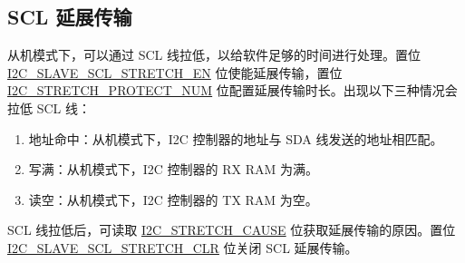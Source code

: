\documentclass[main\_\_CN.tex]{subfiles}
\begin{document}
\subsection {SCL 延展传输}
从机模式下，可以通过 SCL 线拉低，以给软件足够的时间进行处理。置位 \hyperref[fielddesc:I2CSLAVESCLSTRETCHEN]{I2C\_SLAVE\_SCL\_STRETCH\_EN} 位使能延展传输，置位 \hyperref[fielddesc:I2CSTRETCHPROTECTNUM]{I2C\_STRETCH\_PROTECT\_NUM} 位配置延展传输时长。出现以下三种情况会拉低 SCL 线：
\begin{enumerate}
\item 地址命中：从机模式下，I2C 控制器的地址与 SDA 线发送的地址相匹配。
\item 写满：从机模式下，I2C 控制器的 RX RAM 为满。
\item 读空：从机模式下，I2C 控制器的 TX RAM 为空。
\end{enumerate}
SCL 线拉低后，可读取 \hyperref[fielddesc:I2CSTRETCHCAUSE]{I2C\_STRETCH\_CAUSE} 位获取延展传输的原因。置位 \hyperref[fielddesc:I2CSLAVESCLSTRETCHCLR]{I2C\_SLAVE\_SCL\_STRETCH\_CLR} 位关闭 SCL 延展传输。
\end{document}
